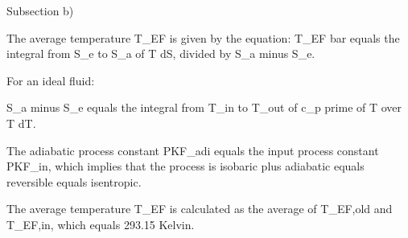 Subsection b)

The average temperature T_EF is given by the equation:
T_EF bar equals the integral from S_e to S_a of T dS, divided by S_a minus S_e.

For an ideal fluid:

S_a minus S_e equals the integral from T_in to T_out of c_p prime of T over T dT.

The adiabatic process constant PKF_adi equals the input process constant PKF_in, which implies that the process is isobaric plus adiabatic equals reversible equals isentropic.

The average temperature T_EF is calculated as the average of T_EF,old and T_EF,in, which equals 293.15 Kelvin.